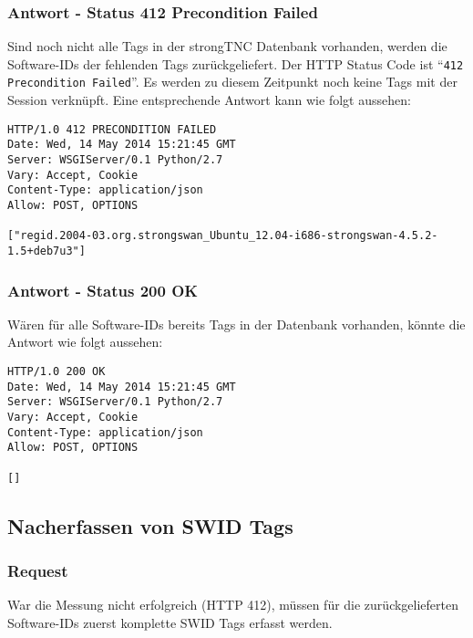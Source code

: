 \documentclass[10pt,a4paper]{scrartcl}
\begin{document}
\subsubsection{Antwort - Status 412 Precondition Failed}

Sind noch nicht alle Tags in der strongTNC Datenbank vorhanden, werden die
Software-IDs der fehlenden Tags zurückgeliefert. Der HTTP Status Code ist
``\texttt{412 Precondition Failed}''. Es werden zu diesem Zeitpunkt noch keine
Tags mit der Session verknüpft. Eine entsprechende Antwort kann wie folgt
aussehen:

\begin{small}\begin{lstlisting}
HTTP/1.0 412 PRECONDITION FAILED
Date: Wed, 14 May 2014 15:21:45 GMT
Server: WSGIServer/0.1 Python/2.7
Vary: Accept, Cookie
Content-Type: application/json
Allow: POST, OPTIONS

["regid.2004-03.org.strongswan_Ubuntu_12.04-i686-strongswan-4.5.2-1.5+deb7u3"]
\end{lstlisting}\end{small}

\subsubsection{Antwort - Status 200 OK}

Wären für alle Software-IDs bereits Tags in der Datenbank vorhanden, könnte die Antwort wie folgt aussehen:

\begin{small}\begin{lstlisting}
HTTP/1.0 200 OK
Date: Wed, 14 May 2014 15:21:45 GMT
Server: WSGIServer/0.1 Python/2.7
Vary: Accept, Cookie
Content-Type: application/json
Allow: POST, OPTIONS

[]
\end{lstlisting}\end{small}

\subsection{Nacherfassen von SWID Tags}

\subsubsection{Request}

War die Messung nicht erfolgreich (HTTP 412), müssen für die zurückgelieferten
Software-IDs zuerst komplette SWID Tags erfasst werden.
\end{document}
